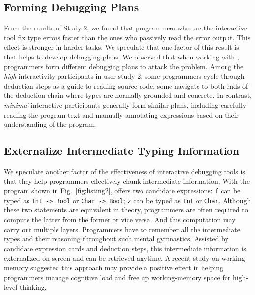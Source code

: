 \subsection{Forming Debugging Plans}
From the results of Study 2, we found that programmers who use the interactive tool fix type errors faster than the ones who passively read the error output. This effect is stronger in harder tasks. We speculate that one factor of this result is that  \chameleon{} helps to develop debugging plans. We observed that when working with \chameleon{}, programmers form different debugging plans to attack the problem. Among the \textit{high} interactivity participants in user study 2, some programmers cycle through deduction steps as a guide to reading source code; some navigate to both ends of the deduction chain where types are normally grounded and concrete. In contrast, \textit{minimal} interactive participants generally form similar plans, including carefully reading the program text and manually annotating expressions based on their understanding of the program.


\subsection{Externalize Intermediate Typing Information}
We speculate another factor of the effectiveness of \chameleon{} interactive debugging tools is that they help programmers effectively chunk intermediate information. With the program shown in Fig.~\ref{fig:listing2}, \chameleon{} offers two candidate expressions: \texttt{f} can be typed as \texttt{Int -> Bool} or \texttt{Char -> Bool}; \texttt{z} can be typed as \texttt{Int} or \texttt{Char}. Although  these two statements are equivalent in theory, programmers are often required to compute the latter from the former or vice versa. And this computation may carry out multiple layers. Programmers have to remember all the intermediate types and their reasoning throughout such mental gymnastics. Assisted by candidate expression cards and deduction steps, this intermediate information is externalized on screen and can be retrieved anytime. A recent study on working memory \cite{crichton_role_2021} suggested this approach may provide a positive effect in helping programmers manage cognitive load and free up working-memory space for high-level thinking.


